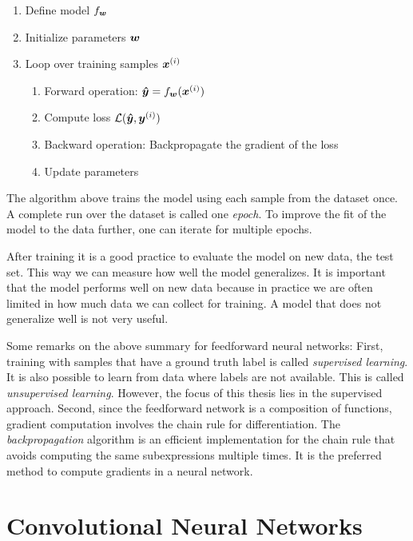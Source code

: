 		\begin{enumerate}
			\item Define model $f_{\bm{w}}$
			\item Initialize parameters $\bm{w}$
			\item Loop over training samples $\bm{x}^{(i)}$ %
			\begin{enumerate}
				\item Forward operation: $\bm{\hat{y}} = f_{\bm{w}}(\bm{x}^{(i)})$
				\item Compute loss $\mathcal{L}(\bm{\hat{y}}, \bm{y}^{(i)})$
				\item Backward operation: Backpropagate the gradient of the loss 
				\item Update parameters
			\end{enumerate}
		\end{enumerate}
		The algorithm above trains the model using each sample from the dataset once.
		A complete run over the dataset is called one \emph{epoch}.
		To improve the fit of the model to the data further, one can iterate for multiple epochs.
		
		After training it is a good practice to evaluate the model on new data, the test set.
		This way we can measure how well the model generalizes.
		It is important that the model performs well on new data because in practice we are often limited in how much data we can collect for training.
		A model that does not generalize well is not very useful.
		
		Some remarks on the above summary for feedforward neural networks:
		First, training with samples that have a ground truth label is called \emph{supervised learning}.
		It is also possible to learn from data where labels are not available.
		This is called \emph{unsupervised learning}.
		However, the focus of this thesis lies in the supervised approach.
		Second, since the feedforward network is a composition of functions, gradient computation involves the chain rule for differentiation.
		The \emph{backpropagation} algorithm is an efficient implementation for the chain rule that avoids computing the same subexpressions multiple times.
		It is the preferred method to compute gradients in a neural network.
		
	\section{Convolutional Neural Networks}
		
